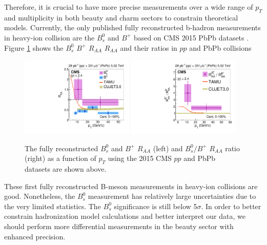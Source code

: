 
\clearpage

Therefore, it is crucial to have more precise measurements over a wide range of $p_T$ and multiplicity in both beauty and charm sectors to constrain theoretical models. Currently, the only published fully reconstructed b-hadron measurements in heavy-ion collision are the $B^0_s$ and $B^+$ based on CMS 2015 PbPb datasets \cite{CMSBsBP2015}. Figure \ref{BsBP2015} shows the $B^0_s$ $B^+$ $R_{AA}$ $R_{AA}$ and their ratios in $pp$ and PbPb collisions

\begin{figure}[hbtp]
\begin{center}
\includegraphics[width=0.48\textwidth]{Figures/Chapter2/CMSBsBPRAA2015.pdf}
\includegraphics[width=0.48\textwidth]{Figures/Chapter2/CMSBsBP2015.pdf}
\caption{The fully reconstructed $B^0_s$ and $B^+$ $R_{AA}$ (left) and $B^0_s/B^+$ $R_{AA}$ ratio (right) as a function of $p_T$ using the 2015 CMS $pp$ and PbPb datasets are shown above.}
\label{BsBP2015}
\end{center}
\end{figure}   


These first fully reconstructed B-meson measurements in heavy-ion collisions are good. Nonetheless, the $B^0_s$ measurement has relatively large uncertainties due to the very limited statistics. The $B^0_s$ significance is still below 5$\sigma$. In order to better constrain hadronization model calculations and better interpret our data, we should perform more differential measurements in the beauty sector with enhanced precision. 

